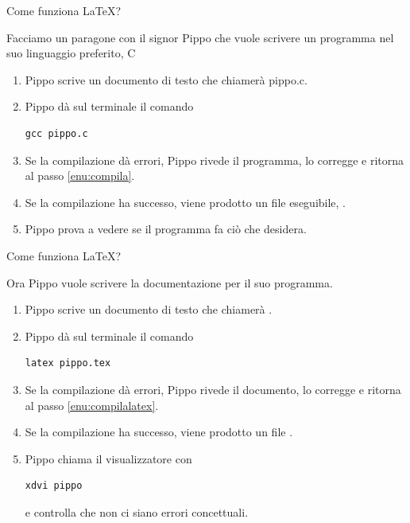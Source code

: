 \documentclass{beamer}
\begin{document}
\begin{frame}[fragile]{Come funziona \LaTeX?}

Facciamo un paragone con il signor Pippo che vuole scrivere un programma
nel suo linguaggio preferito, C

\bigskip{}
\begin{enumerate}
\item Pippo scrive un documento di testo che chiamer\`a pippo.c.
\item \label{enu:compila}Pippo dà sul terminale il comando\\

\begin{verbatim}
gcc pippo.c
\end{verbatim}

\item Se la compilazione d\`a errori, Pippo rivede il programma, lo corregge
e ritorna al passo \ref{enu:compila}.
\item Se la compilazione ha successo, viene prodotto un file eseguibile,
.
\item Pippo prova a vedere se il programma fa ciò che desidera.
\end{enumerate}
\end{frame}

\begin{frame}[fragile]{Come funziona \LaTeX?}

Ora Pippo vuole scrivere la documentazione per il suo programma.
\bigskip
\begin{enumerate}
\item Pippo scrive un documento di testo che chiamer\`a .
\item \label{enu:compilalatex}Pippo dà sul terminale il comando

\begin{verbatim}
latex pippo.tex
\end{verbatim}

\item Se la compilazione d\`a errori, Pippo rivede il documento, lo corregge
e ritorna al passo \ref{enu:compilalatex}.
\item Se la compilazione ha successo, viene prodotto un file .
\item Pippo chiama il visualizzatore con

\begin{verbatim}
xdvi pippo
\end{verbatim}

e controlla che non ci siano errori concettuali.
\end{enumerate}
\end{frame}
\end{document}
